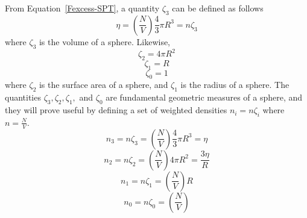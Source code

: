 \documentclass[double,12pt]{beavtex}
\begin{document}
From Equation~\ref{Fexcess-SPT}, a quantity $\zeta_{3}$ can be defined as follows
\begin{equation}{\eta =\left(\frac{N}{V}\right)\frac{4}{3}\pi{R^3}=n\zeta_{3}}\end{equation}
where $\zeta_{3}$ is the volume of a sphere. Likewise,
\begin{equation}{\zeta_{2}=4\pi{R^2}}\end{equation}
\begin{equation}{\zeta_{1}=R}\end{equation}
\begin{equation}{\zeta_{0}=1}\end{equation}
where $\zeta_{2}$ is the surface area of a sphere, and $\zeta_{1}$ is the 
radius of a sphere. The quantities $\zeta_{3}, \zeta_{2}, \zeta_{1},$ 
and $\zeta_{0}$ are fundamental geometric measures of a sphere, and they 
will prove useful by defining a set of weighted densities $n_{i}=n\zeta_{i}$ 
where $n=\frac{N}{V}$. 
\begin{equation}\label{n3}{n_{3}=n\zeta_{3}=\left(\frac{N}{V}\right)\frac{4}{3}\pi{R^3}=\eta}\end{equation}
\begin{equation}\label{n2}{n_{2}=n\zeta_{2}=\left(\frac{N}{V}\right)4\pi{R^2}=\frac{3\eta}{R}}\end{equation}
\begin{equation}\label{n1}{n_{1}=n\zeta_{1}=\left(\frac{N}{V}\right)R}\end{equation}
\begin{equation}\label{n0}{n_{0}=n\zeta_{0}=\left(\frac{N}{V}\right)}\end{equation}
\end{document}
